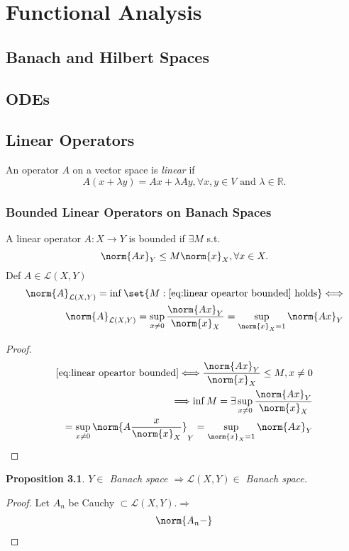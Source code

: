 \documentclass[a4paper]{book}
\newtheorem{prop}[thm]{Proposition}
{
    \theoremstyle{nonumberplain}
    \theoremheaderfont{\normalfont}
    \theorembodyfont{\normalfont}
    \theoremsymbol{\mbox{$\Box$}}
    \newtheorem{proof}{proof}
}
{
    \theoremstyle{nonumberplain}
    \newtheorem{myDef}{Definition}
}
\DeclarePairedDelimiter{\norm}\lVert\rVert
\DeclarePairedDelimiter{\set}\lbrace\rbrace
\def\L{\mathcal{L}}
\def\R{\mathbb{R}}
\def\bimplies{\Longleftrightarrow}
\def\implies{\Longrightarrow}
\begin{document}
\part{Functional Analysis}
\chapter{Banach and Hilbert Spaces}
\chapter{ODEs}
\chapter{Linear Operators}
\begin{myDef}[linear]
    An operator $A$ on a vector space is \emph{linear} if
    \[
        A(x+\lambda y)=Ax+\lambda Ay, \forall x, y \in V \text{ and } \lambda \in \R.
    \]
\end{myDef}
\section{Bounded Linear Operators on Banach Spaces}
\begin{myDef}
    A linear operator $A: X \to Y$ is bounded if $\exists M$ s.t.
    \begin{equation}\label{eq:linear opeartor bounded}
        \norm{Ax}_Y \leq M \norm{x}_X, \forall x \in X.
    \end{equation}
    Def $A \in \L(X,Y)$
    \begin{align}
        \norm{A}_{\L(X,Y)}=\inf\set{M:\eqref{eq:linear opeartor bounded} \text{ holds}} \bimplies \\
        \norm{A}_{\L(X,Y)}=\sup_{x \neq 0}\frac{\norm{Ax}_Y}{\norm{x}_X}=\sup_{\norm{x}_X=1}\norm{Ax}_Y
    \end{align}
\end{myDef}
\begin{proof}
    \begin{align*}
        \eqref{eq:linear opeartor bounded} \bimplies \frac{\norm{Ax}_Y}{\norm{x}_X} \leq M, x \neq 0 \\
        \implies \inf{M} = \exists \sup_{x \neq 0}\frac{\norm{Ax}_Y}{\norm{x}_X}                     \\
        = \sup_{x \neq 0}\norm{A\frac{x}{\norm{x}_X}}_Y = \sup_{\norm{x}_X=1}\norm{Ax}_Y
    \end{align*}
\end{proof}
\begin{prop}
    $Y \in$ Banach space $\implies \L(X,Y) \in$ Banach space.
\end{prop}
\begin{proof}
    Let $A_n$ be Cauchy $\subset \L(X,Y). \implies$
    \begin{align}
        \norm{A_n -}
    \end{align}
\end{proof}
\end{document}
